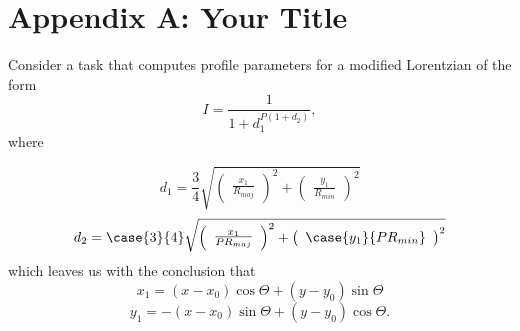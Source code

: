 \appendix
\section{Appendix A: Your Title}



Consider a task that computes profile parameters for a modified 
Lorentzian of the form
\begin{equation}
   I = \frac{1}{1 + d_{1}^{P (1 + d_{2} )}}, 
\end{equation}
where
\begin{mathletters}
\begin{equation}
   d_{1} = \frac{3}{4} \sqrt{ \left( \begin{array}{c} \frac{x_{1}}{R_{maj}} 
   \end{array} \right) ^{2} + \left( \begin{array}{c} \frac{y_{1}}{R_{min}} 
   \end{array} \right) ^{2} } 
\end{equation}
\begin{equation}
   d_{2} = \case{3}{4} \sqrt{ \left( \begin{array}{c} \frac{x_{1}}{P R_{maj}}
   \end{array} \right) ^{2} + \left( \begin{array}{c} \case{y_{1}}{P R_{min}} 
   \end{array} \right) ^{2} }  
\end{equation}
which leaves us with the conclusion that
\begin{equation}
   x_{1} = (x - x_{0}) \cos \Theta + (y - y_{0}) \sin \Theta 
\end{equation}
\begin{equation}
   y_{1} = -(x - x_{0}) \sin \Theta + (y - y_{0}) \cos \Theta. 
\end{equation}
\end{mathletters}
